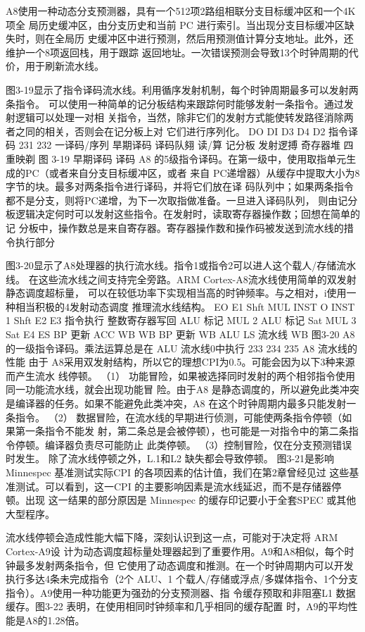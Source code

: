 A8使用一种动态分支预测器，具有一个512项2路组相联分支目标缓冲区和一个4K 项全
局历史缓冲区，由分支历史和当前 PC 进行索引。当出现分支目标缓冲区缺失时，则在全局历
史缓冲区中进行预测，然后用预测值计算分支地址。此外，还维护一个8项返回栈，用于跟踪
返回地址。一次错误预测会导致13个时钟周期的代价，用于刷新流水线。

图3-19显示了指令译码流水线。利用循序发射机制，每个时钟周期最多可以发射两条指令。
可以使用一种简单的记分板结构来跟踪何时能够发射一条指令。通过发射逻辑可以处理一对相
关指令，当然，除非它们的发射方式能使转发路径消除两者之同的相关，否则会在记分板上对
它们进行序列化。
DO
DI
D3
D4
D2
指令译码
231
232
一译码/序列
旱期译码
译码队翗
读/算
记分板
发射逻搏
奇存器堆
四重映剃
图 3-19
早期译码
译码
A8 的5级指令译码。在第一级中，使用取指单元生成的PC（或者来自分支目标缓冲区，或者
来自 PC递增器）从缓存中提取大小为8字节的块。最多对两条指令进行译码，并将它们放在译
码队列中；如果两条指令都不是分支，则将PC递增，为下一次取指做准备。一旦进入译码队列，
则由记分板逻辑决定何时可以发射这些指令。在发射时，读取寄存器操作数；回想在简单的记
分板中，操作数总是来自寄存器。寄存器操作数和操作码被发送到流水线的措令执行部分

图3-20显示了A8处理器的执行流水线。指令1或指令2可以进人这个载人/存储流水线。
在这些流水线之间支持完全旁路。ARM Cortex-A8流水线使用简单的双发射静态调度超标量，
可以在较低功率下实现相当高的时钟频率。与之相对，i使用一种相当积极的4发射动态调度
推理流水线结构。
EO
E1
Shft
MUL
INST O
INST 1
Shft
E2
E3
指令执行
整数寄存器写回
ALU
标记
MUL
2
ALU
标记
Sat
MUL
3
Sat
E4
ES
BP
更新
ACC
WB
WB
BP
更新
WB
ALU
LS 流水线
WB
图3-20 A8 的一级指令译码。乘法运算总是在 ALU 流水线0中执行
233
234
235
A8 流水线的性能
由于 A8采用双发射结构，所以它的理想CPI为0.5。可能会因为以下3种来源而产生流水
线停顿。
（1） 功能冒险，如果被选择同时发射的两个相邻指令使用同一功能流水线，就会出现功能冒
险。由于A8 是静态调度的，所以避免此类冲突是编译器的任务。如果不能避免此类冲突，A8
在这个时钟周期内最多只能发射一条指令。
（2） 数据冒险，在流水线的早期进行侦测，可能使两条指令停顿（如果第一条指令不能发
射，第二条总是会被停顿），也可能是一对指令中的第二条指令停顿。编译器负责尽可能防止
此类停顿。
（3）控制冒险，仅在分支预测错误时发生。
除了流水线停顿之外，L.1和L2 缺失都会导致停顿。
图3-21是影响 Minnespec 基准测试实际CPI 的各项因素的估计值，我们在第2章曾经见过
这些基准测试。可以看到，这一CPI 的主要影响因素是流水线延迟，而不是存储器停顿。出现
这一结果的部分原因是 Minnespec 的缓存印记要小于全套SPEC 或其他大型程序。

流水线停顿会造成性能大幅下降，深刻认识到这一点，可能对于决定将 ARM Cortex-A9设
计为动态调度超标量处理器起到了重要作用。A9和A8相似，每个时钟最多发射两条指令，但
它使用了动态调度和推测。在一个时钟周期内可以开发执行多达4条未完成指令（2个 ALU、1
个载人/存储或浮点/多媒体指令、1个分支指令）。A9使用一种功能更为强劲的分支预测器、指
令缓存预取和非阻塞L1 数据缓存。图3-22 表明，在使用相同时钟频率和几乎相同的缓存配置
时，A9的平均性能是A8的1.28倍。

